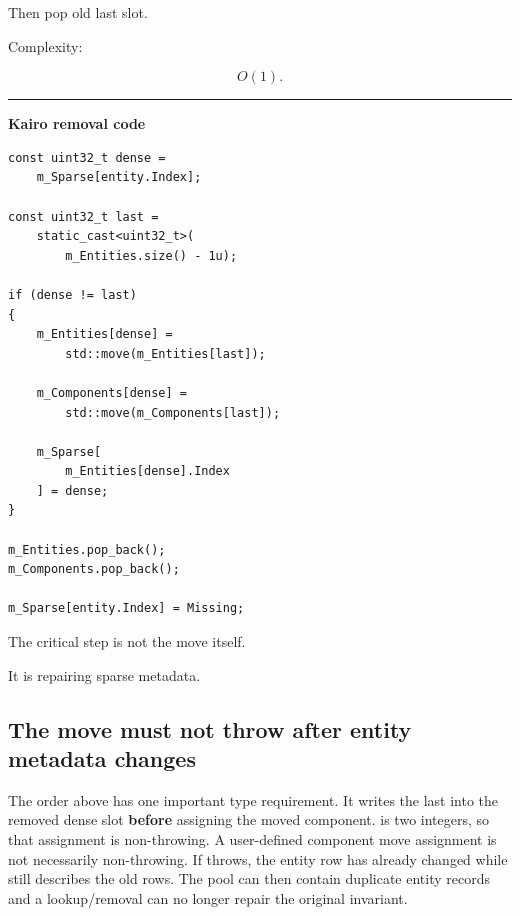 Then pop old last slot.

Complexity:

\[
O(1).
\]

\begin{center}\rule{0.5\linewidth}{0.5pt}\end{center}

\textbf{Kairo removal code}

\begin{verbatim}
const uint32_t dense =
    m_Sparse[entity.Index];

const uint32_t last =
    static_cast<uint32_t>(
        m_Entities.size() - 1u);

if (dense != last)
{
    m_Entities[dense] =
        std::move(m_Entities[last]);

    m_Components[dense] =
        std::move(m_Components[last]);

    m_Sparse[
        m_Entities[dense].Index
    ] = dense;
}

m_Entities.pop_back();
m_Components.pop_back();

m_Sparse[entity.Index] = Missing;
\end{verbatim}

The critical step is not the move itself.

It is repairing sparse metadata.

\subsection{The move must not throw after entity metadata changes}\label{05-engine-i-ch015-the-move-must-not-throw-after-entity-metadata-changes}

\hypertarget{05-engine-i-ch015-the-move-must-not-throw-after-entity-metadata-changes}{}

The order above has one important type requirement. It writes the last  into the removed dense slot \textbf{before} assigning the moved  component.  is two integers, so that assignment is non-throwing. A user-defined component move assignment is not necessarily non-throwing. If  throws, the entity row has already changed while  still describes the old rows. The pool can then contain duplicate entity records and a lookup/removal can no longer repair the original invariant.

